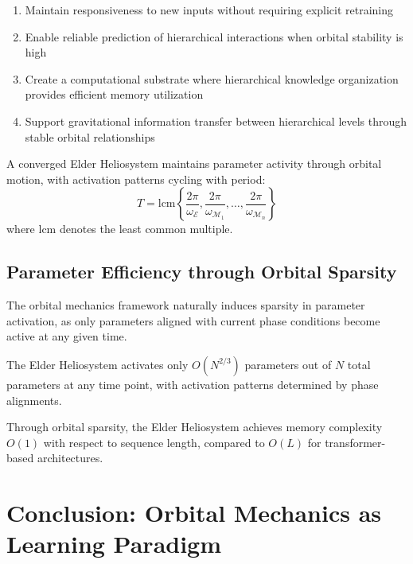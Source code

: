 \begin{enumerate}
    \item Maintain responsiveness to new inputs without requiring explicit retraining
    \item Enable reliable prediction of hierarchical interactions when orbital stability is high
    \item Create a computational substrate where hierarchical knowledge organization provides efficient memory utilization
    \item Support gravitational information transfer between hierarchical levels through stable orbital relationships
\end{enumerate}

\begin{theorem}
A converged Elder Heliosystem maintains parameter activity through orbital motion, with activation patterns cycling with period:
\begin{equation}
T = \text{lcm}\left\{\frac{2\pi}{\omega_{\mathcal{E}}}, \frac{2\pi}{\omega_{\mathcal{M}_1}}, \ldots, \frac{2\pi}{\omega_{\mathcal{M}_n}}\right\}
\end{equation}
where $\text{lcm}$ denotes the least common multiple.
\end{theorem}

\subsection{Parameter Efficiency through Orbital Sparsity}

The orbital mechanics framework naturally induces sparsity in parameter activation, as only parameters aligned with current phase conditions become active at any given time.

\begin{proposition}
The Elder Heliosystem activates only $O(N^{2/3})$ parameters out of $N$ total parameters at any time point, with activation patterns determined by phase alignments.
\end{proposition}

\begin{corollary}
Through orbital sparsity, the Elder Heliosystem achieves memory complexity $O(1)$ with respect to sequence length, compared to $O(L)$ for transformer-based architectures.
\end{corollary}



\section{Conclusion: Orbital Mechanics as Learning Paradigm}

